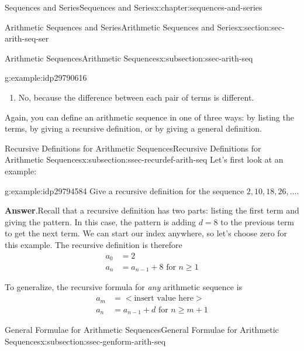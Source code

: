 \documentclass[twoside,10pt,]{book}
\newcommand{\blocktitlefont}{\relax}
\numberwithin{equation}{section}
\newcommand{\lt}{<}
\newcommand{\gt}{>}
\newcommand{\amp}{&}
\begin{document}
\begin{chapterptx}{Sequences and Series}{}{Sequences and Series}{}{}{x:chapter:sequences-and-series}
\begin{sectionptx}{Arithmetic Sequences and Series}{}{Arithmetic Sequences and Series}{}{}{x:section:sec-arith-seq-ser}
\begin{subsectionptx}{Arithmetic Sequences}{}{Arithmetic Sequences}{}{}{x:subsection:ssec-arith-seq}
\begin{example}{}{g:example:idp29790616}
\begin{enumerate}[label=(\alph*)]
\item{}No, because the difference between each pair of terms is different.%
\end{enumerate}
\end{example}
%
\par
Again, you can define an arithmetic sequence in one of three ways:  by listing the terms, by giving a recursive definition, or by giving a general definition.%
\end{subsectionptx}
%
%
\typeout{************************************************}
\typeout{************************************************}
%
\begin{subsectionptx}{Recursive Definitions for Arithmetic Sequences}{}{Recursive Definitions for Arithmetic Sequences}{}{}{x:subsection:ssec-recurdef-arith-seq}
Let's first look at an example: \begin{example}{}{g:example:idp29794584}%
Give a recursive definition for the sequence \(2, 10, 18, 26, \ldots\).\par\smallskip%
\noindent\textbf{\blocktitlefont Answer}.\label{g:answer:idp29795992}{}\hypertarget{g:answer:idp29795992}{}\quad{}Recall that a recursive definition has two parts:  listing the first term and giving the pattern.  In this case, the pattern is adding \(d = 8\) to the previous term to get the next term.  We can start our index anywhere, so let's choose zero for this example.  The recursive definition is therefore%
\begin{align*}
a_0 \amp =2\\
a_n \amp = a_{n-1}+8 \text{   for }n\ge 1
\end{align*}
\end{example}
%
\par
To generalize, the recursive formula for \emph{any} arithmetic sequence is%
\begin{align*}
a_m\amp = \lt\text{insert value here}\gt\\
a_n\amp = a_{n-1}+d \text{   for }n\ge m+1
\end{align*}
%
\end{subsectionptx}
%
%
\typeout{************************************************}
\typeout{************************************************}
%
\begin{subsectionptx}{General Formulae for Arithmetic Sequences}{}{General Formulae for Arithmetic Sequences}{}{}{x:subsection:ssec-genform-arith-seq}

\end{subsectionptx}
\end{sectionptx}
\end{chapterptx}
\end{document}
